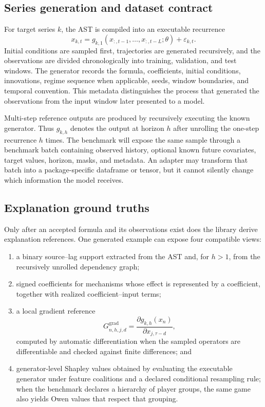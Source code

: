 \subsection{Series generation and dataset contract}

For target series $k$, the AST is compiled into an executable recurrence
\[
x_{k,t}=g_{k,1}\!\left(x_{:,t-1},\ldots,x_{:,t-L};\theta\right)
       +\varepsilon_{k,t}.
\]
Initial conditions are sampled first, trajectories are generated recursively,
and the observations are divided chronologically into training, validation,
and test windows. The generator records the formula, coefficients, initial
conditions, innovations, regime sequence when applicable, seeds, window
boundaries, and temporal convention. This metadata distinguishes the process
that generated the observations from the input window later presented to a
model.

Multi-step reference outputs are produced by recursively executing the known
generator. Thus $g_{k,h}$ denotes the output at horizon $h$ after unrolling the
one-step recurrence $h$ times. The benchmark will expose the same sample through
a benchmark batch containing observed history, optional known future
covariates, target values, horizon, masks, and metadata. An adapter may transform
that batch into a package-specific dataframe or tensor, but it cannot silently
change which information the model receives.

\subsection{Explanation ground truths}

Only after an accepted formula and its observations exist does the library
derive explanation references. One generated example can expose four
compatible views:

\begin{enumerate}
    \item a binary source--lag support extracted from the AST and, for
    $h>1$, from the recursively unrolled dependency graph;
    \item signed coefficients for mechanisms whose effect is represented by a
    coefficient, together with realized coefficient--input terms;
    \item a local gradient reference
    \[
    G^{\mathrm{grad}}_{n,h,j,d}
      =\frac{\partial g_{k,h}(x_n)}
             {\partial x_{j,\tau-d}},
    \]
    computed by automatic differentiation when the sampled operators are
    differentiable and checked against finite differences; and
    \item generator-level Shapley values obtained by evaluating the executable
    generator under feature coalitions and a declared conditional resampling
    rule; when the benchmark declares a hierarchy of player groups, the same
    game also yields Owen values that respect that grouping.
\end{enumerate}

